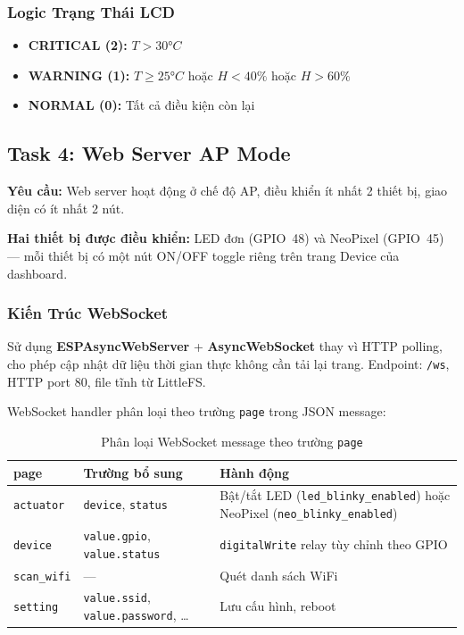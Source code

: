 \documentclass[12pt,a4paper]{article}
\begin{document}
\subsubsection{Logic Trạng Thái LCD}

\begin{itemize}
    \item \textbf{CRITICAL (2):} $T > 30°C$
    \item \textbf{WARNING (1):} $T \geq 25°C$ hoặc $H < 40\%$ hoặc $H > 60\%$
    \item \textbf{NORMAL (0):} Tất cả điều kiện còn lại
\end{itemize}

\subsection{Task 4: Web Server AP Mode}

\textbf{Yêu cầu:} Web server hoạt động ở chế độ AP, điều khiển ít nhất 2 thiết bị, giao diện có ít nhất 2 nút.

\textbf{Hai thiết bị được điều khiển:} LED đơn (GPIO~48) và NeoPixel (GPIO~45) — mỗi thiết bị có một nút ON/OFF toggle riêng trên trang Device của dashboard.

\subsubsection{Kiến Trúc WebSocket}

Sử dụng \textbf{ESPAsyncWebServer} + \textbf{AsyncWebSocket} thay vì HTTP polling, cho phép cập nhật dữ liệu thời gian thực không cần tải lại trang. Endpoint: \texttt{/ws}, HTTP port 80, file tĩnh từ LittleFS.

WebSocket handler phân loại theo trường \texttt{page} trong JSON message:

\begin{table}[H]
\centering
\begin{tabular}{|l|l|p{6cm}|}
\hline
\textbf{page} & \textbf{Trường bổ sung} & \textbf{Hành động} \\
\hline
\texttt{actuator} & \texttt{device}, \texttt{status} & Bật/tắt LED (\texttt{led\_blinky\_enabled}) hoặc NeoPixel (\texttt{neo\_blinky\_enabled}) \\
\texttt{device}   & \texttt{value.gpio}, \texttt{value.status} & \texttt{digitalWrite} relay tùy chỉnh theo GPIO \\
\texttt{scan\_wifi} & — & Quét danh sách WiFi \\
\texttt{setting} & \texttt{value.ssid}, \texttt{value.password}, … & Lưu cấu hình, reboot \\
\hline
\end{tabular}
\caption{Phân loại WebSocket message theo trường \texttt{page}}
\end{table}
\end{document}
